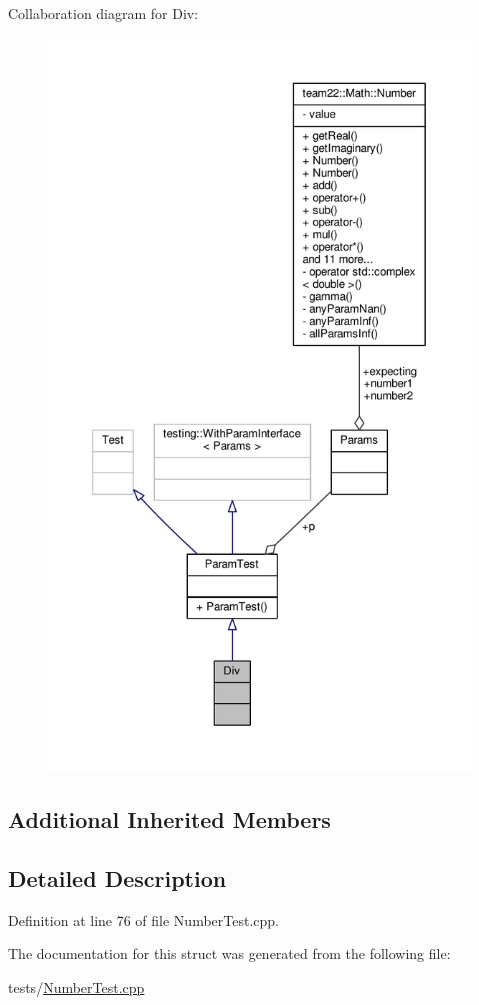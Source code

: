 Collaboration diagram for Div\+:
\nopagebreak
\begin{figure}[H]
\begin{center}
\leavevmode
\includegraphics[height=550pt]{struct_div__coll__graph}
\end{center}
\end{figure}
\subsection*{Additional Inherited Members}


\subsection{Detailed Description}


Definition at line 76 of file Number\+Test.\+cpp.



The documentation for this struct was generated from the following file\+:\begin{DoxyCompactItemize}
\item 
tests/\hyperlink{_number_test_8cpp}{Number\+Test.\+cpp}\end{DoxyCompactItemize}
